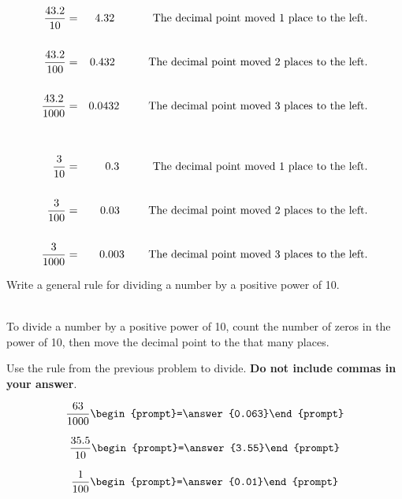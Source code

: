 \documentclass{ximera}
\begin{document}
\begin{eqnarray*}
\frac{43.2}{10} &=&  4.32 \hspace{0.48in} \textrm{The decimal point moved 1 place to the left.} \\
& & \\
\frac{43.2}{100} &=& 0.432 \hspace{0.42in}  \textrm{The decimal point moved 2 places to the left.} \\
& & \\
\frac{43.2}{1000} &=& 0.0432 \hspace{0.365in}  \textrm{The decimal point moved 3 places to the left.} \\
& & \\
& & \\
\frac{3}{10} &=& 0.3 \hspace{0.42in} \textrm{The decimal point moved 1 place to the left.} \\
& & \\
\frac{3}{100} &=& 0.03 \hspace{0.36in} \textrm{The decimal point moved 2 places to the left.} \\
& & \\
\frac{3}{1000} &=& 0.003 \hspace{0.3in} \textrm{The decimal point moved 3 places to the left.} \\
\end{eqnarray*}

\begin{question} Write a general rule for dividing a number by a positive power of 10.

~ \\[1em] 

To divide a number by a positive power of 10, count the number of zeros in the power of 10, then move the decimal point to the 
 that many places.


\end{question}




\begin{question}  Use the rule from the previous problem to divide.   \textbf{Do not include commas in your answer}.
  

\[ \frac{63}{1000} \begin{prompt}=\answer{0.063}\end{prompt} \]

\[ \frac{35.5}{10} \begin{prompt}=\answer{3.55}\end{prompt} \]

\[ \frac{1}{100} \begin{prompt}=\answer{0.01}\end{prompt} \]

\end{question}


\end{document}
